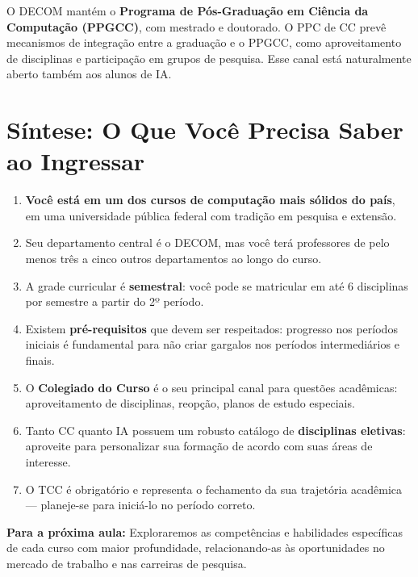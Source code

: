 \documentclass[9pt,a4paper]{extarticle}
\newcommand{\impt}[1]{\textcolor{important}{\textbf{#1}}}
\newcommand{\ntc}[1]{\textcolor{notice}{#1}}
\begin{document}
O DECOM mantém o \textbf{Programa de Pós-Graduação em Ciência da Computação (PPGCC)}, com mestrado e doutorado. O PPC de CC prevê mecanismos de integração entre a graduação e o PPGCC, como aproveitamento de disciplinas e participação em grupos de pesquisa. Esse canal está naturalmente aberto também aos alunos de IA.

\section{Síntese: O Que Você Precisa Saber ao Ingressar}

\begin{enumerate}
  \item \impt{Você está em um dos cursos de computação mais sólidos do país}, em uma universidade pública federal com tradição em pesquisa e extensão.
  \item \ntc{Seu departamento central é o DECOM, mas você terá professores de pelo menos três a cinco outros departamentos ao longo do curso.}
  \item A grade curricular é \textbf{semestral}: você pode se matricular em até 6 disciplinas por semestre a partir do 2º período.
  \item Existem \textbf{pré-requisitos} que devem ser respeitados: progresso nos períodos iniciais é fundamental para não criar gargalos nos períodos intermediários e finais.
  \item O \textbf{Colegiado do Curso} é o seu principal canal para questões acadêmicas: aproveitamento de disciplinas, reopção, planos de estudo especiais.
  \item Tanto CC quanto IA possuem um robusto catálogo de \textbf{disciplinas eletivas}: aproveite para personalizar sua formação de acordo com suas áreas de interesse.
  \item O TCC é obrigatório e representa o fechamento da sua trajetória acadêmica --- planeje-se para iniciá-lo no período correto.
\end{enumerate}

\bigskip
\noindent\colorbox{shadegray}{\parbox{\dimexpr\linewidth-2\fboxsep}{%
\textbf{Para a próxima aula:} Exploraremos as competências e habilidades específicas de cada curso com maior profundidade, relacionando-as às oportunidades no mercado de trabalho e nas carreiras de pesquisa.
}}
\end{document}
